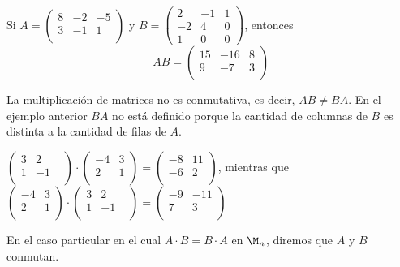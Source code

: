 \begin{ejem}
Si $A=\begin{pmatrix}
    8 & -2 & -5\\
    3 & -1 & 1 \\
    \end{pmatrix}$ y $B=\begin{pmatrix}
    2 & -1 &1\\
    -2 & 4 &0\\
    1 &0 &0
    \end{pmatrix}$, entonces 
    \[AB=\begin{pmatrix}
    15 & -16 &8\\
    9 & -7 &3\\
    \end{pmatrix}\]
\end{ejem}


La multiplicación de matrices no es conmutativa, es decir, $AB \not= BA$. En el ejemplo anterior $BA$ no está definido porque la cantidad de columnas  de $B$ es distinta a la cantidad de filas de $A$.


\begin{ejem}
    $\begin{pmatrix}
   3 & 2 & \\
    1 & -1  \\
    \end{pmatrix}\cdot \begin{pmatrix}
    -4 & 3 \\
    2 & 1  \\
    \end{pmatrix}=\begin{pmatrix}
    -8 & 11 \\
    -6 & 2  \\
    \end{pmatrix}$, mientras que 
     $\begin{pmatrix}
    -4 & 3 \\
    2 & 1  \\
    \end{pmatrix}\cdot\begin{pmatrix}
   3 & 2 & \\
    1 & -1  \\
    \end{pmatrix} =\begin{pmatrix}
    -9 & -11 \\
    7 & 3  \\
    \end{pmatrix}$
\end{ejem}
En el caso particular en el cual $A\cdot B = B\cdot A$ en $\M_n$, diremos que $A$ y $B$ conmutan.

